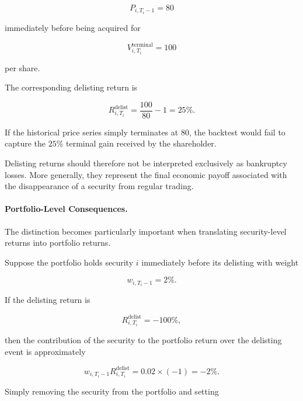 \documentclass[11pt,a4paper]{article}
\begin{document}
\begin{equation}
P_{i,T_i-1}=80
\end{equation}

immediately before being acquired for

\begin{equation}
V_{i,T_i}^{\mathrm{terminal}}=100
\end{equation}

per share.

The corresponding delisting return is

\begin{equation}
R_{i,T_i}^{\mathrm{delist}}
=
\frac{100}{80}-1
=
25\%.
\end{equation}

If the historical price series simply terminates at $80$, the backtest would
fail to capture the $25\%$ terminal gain received by the shareholder.

Delisting returns should therefore not be interpreted exclusively as
bankruptcy losses. More generally, they represent the final economic payoff
associated with the disappearance of a security from regular trading.


\paragraph{Portfolio-Level Consequences.}

The distinction becomes particularly important when translating security-level
returns into portfolio returns.

Suppose the portfolio holds security $i$ immediately before its delisting with
weight

\begin{equation}
w_{i,T_i-1}=2\%.
\end{equation}

If the delisting return is

\begin{equation}
R_{i,T_i}^{\mathrm{delist}}=-100\%,
\end{equation}

then the contribution of the security to the portfolio return over the
delisting event is approximately

\begin{equation}
w_{i,T_i-1}
R_{i,T_i}^{\mathrm{delist}}
=
0.02\times(-1)
=
-2\%.
\end{equation}

Simply removing the security from the portfolio and setting
\end{document}
